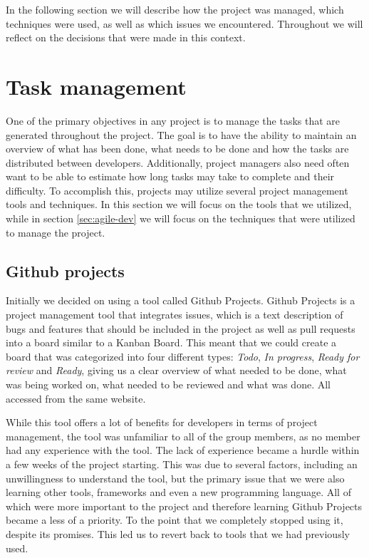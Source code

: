 In the following section we will describe how the project was managed, which techniques were used, as well as which issues we encountered. Throughout we will reflect on the decisions that were made in this context.

\section{Task management}
One of the primary objectives in any project is to manage the tasks that are generated throughout the project. The goal is to have the ability to maintain an overview of what has been done, what needs to be done and how the tasks are distributed between developers. Additionally, project managers also need often want to be able to estimate how long tasks may take to complete and their difficulty. To accomplish this, projects may utilize several project management tools and techniques. In this section we will focus on the tools that we utilized, while in section \ref{sec:agile-dev} we will focus on the techniques that were utilized to manage the project.

\subsection{Github projects}
Initially we decided on using a tool called Github Projects. Github Projects is a project management tool that integrates issues, which is a text description of bugs and features that should be included in the project as well as pull requests into a board similar to a Kanban Board. This meant that we could create a board that was categorized into four different types: \textit{Todo}, \textit{In progress}, \textit{Ready for review} and \textit{Ready}, giving us a clear overview of what needed to be done, what was being worked on, what needed to be reviewed and what was done. All accessed from the same website. 

While this tool offers a lot of benefits for developers in terms of project management, the tool was unfamiliar to all of the group members, as no member had any experience with the tool. The lack of experience became a hurdle within a few weeks of the project starting. This was due to several factors, including an unwillingness to understand the tool, but the primary issue that we were also learning other tools, frameworks and even a new programming language. All of which were more important to the project and therefore learning Github Projects became a less of a priority. To the point that we completely stopped using it, despite its promises.
This led us to revert back to tools that we had previously used.

